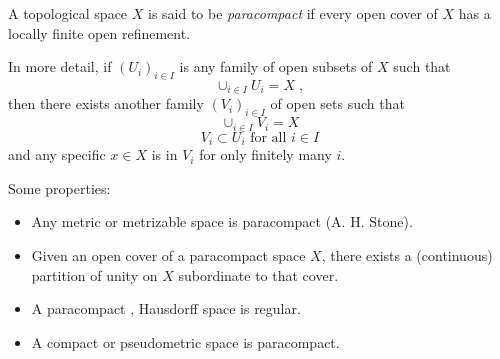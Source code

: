 \documentclass[12pt]{article}
\begin{document}
A topological space $X$ is said to be \emph{paracompact} if every open cover of $X$ has a locally finite open refinement.

In more detail, if $(U_i)_{i\in I}$ is any family of open subsets of $X$ such that $$\cup_{i\in I}U_i = X\;,$$
then there exists another family $(V_i)_{i\in I}$ of open sets such that
$$\cup_{i\in I}V_i = X$$
$$V_i\subset U_i\text{ for all }i\in I$$
and any specific $x\in X$ is in $V_i$ for only finitely many $i$.

Some properties:
\begin{itemize}
\item Any metric or metrizable space is paracompact (A. H. Stone). 
\item Given an open cover of a paracompact space $X$, there exists a (continuous) partition of unity on $X$ subordinate to that cover.
\item A paracompact , Hausdorff space is regular.
\item A compact or pseudometric space is paracompact.
\end{itemize}
\end{document}
